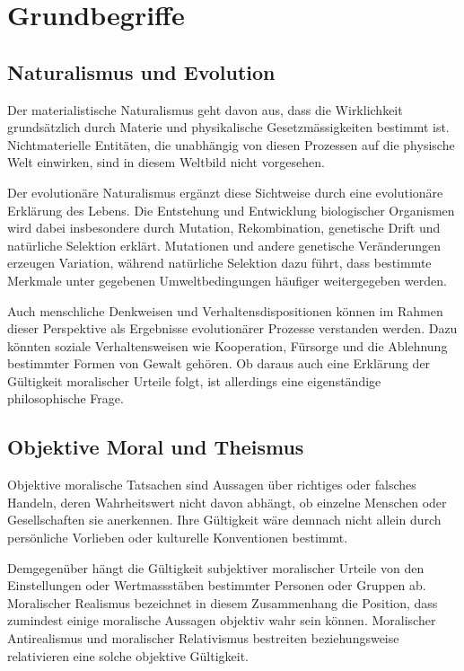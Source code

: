 \documentclass[a4paper,11pt]{article}
\begin{document}
	\section{Grundbegriffe}
	
	\subsection{Naturalismus und Evolution}
	
	Der materialistische Naturalismus geht davon aus, dass die Wirklichkeit
	grundsätzlich durch Materie und physikalische Gesetzmässigkeiten
	bestimmt ist. Nichtmaterielle Entitäten, die unabhängig von diesen
	Prozessen auf die physische Welt einwirken, sind in diesem Weltbild
	nicht vorgesehen.
	
	Der evolutionäre Naturalismus ergänzt diese Sichtweise durch eine
	evolutionäre Erklärung des Lebens. Die Entstehung und Entwicklung
	biologischer Organismen wird dabei insbesondere durch Mutation,
	Rekombination, genetische Drift und natürliche Selektion erklärt.
	Mutationen und andere genetische Veränderungen erzeugen Variation,
	während natürliche Selektion dazu führt, dass bestimmte Merkmale
	unter gegebenen Umweltbedingungen häufiger weitergegeben werden.
	
	Auch menschliche Denkweisen und Verhaltensdispositionen können im
	Rahmen dieser Perspektive als Ergebnisse evolutionärer Prozesse
	verstanden werden. Dazu könnten soziale Verhaltensweisen wie
	Kooperation, Fürsorge und die Ablehnung bestimmter Formen von Gewalt
	gehören. Ob daraus auch eine Erklärung der Gültigkeit moralischer
	Urteile folgt, ist allerdings eine eigenständige philosophische Frage.
	
	\subsection{Objektive Moral und Theismus}
	
	Objektive moralische Tatsachen sind Aussagen über richtiges oder
	falsches Handeln, deren Wahrheitswert nicht davon abhängt, ob
	einzelne Menschen oder Gesellschaften sie anerkennen. Ihre Gültigkeit
	wäre demnach nicht allein durch persönliche Vorlieben oder kulturelle
	Konventionen bestimmt.
	
	Demgegenüber hängt die Gültigkeit subjektiver moralischer Urteile
	von den Einstellungen oder Wertmassstäben bestimmter Personen
	oder Gruppen ab. Moralischer Realismus bezeichnet in diesem
	Zusammenhang die Position, dass zumindest einige moralische
	Aussagen objektiv wahr sein können. Moralischer Antirealismus und
	moralischer Relativismus bestreiten beziehungsweise relativieren
	eine solche objektive Gültigkeit.
	
\end{document}
